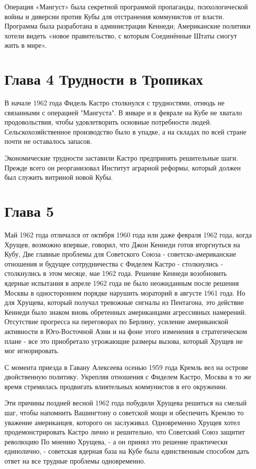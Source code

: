 \documentclass[14pt]{extreport}
\begin{document}
Операция «Мангуст» была секретной программой пропаганды, психологической войны и диверсии против Кубы для отстранения коммунистов от власти. Программа была разработана в администрации Кеннеди; Американские политики хотели видеть «новое правительство, с которым Соединённые Штаты смогут жить в мире».


\section{Глава 4 Трудности в Тропиках}

В начале 1962 года Фидель Кастро столкнулся с трудностями, отнюдь не связанными с операцией "Мангуста". В январе и в феврале на Кубе не хватало продовольствия, чтобы удовлетворить основные потребности людей. Сельскохозяйственное производство было в упадке, а на складах по всей стране почти не оставалось запасов.

Экономические трудности заставили Кастро предпринять решительные шаги. Прежде всего он реорганизовал Институт аграрной реформы, который должен был служить витриной новой Кубы.	

\section{Глава 5}

Май 1962 года отличался от октября 1960 года или даже февраля 1962 года, когда Хрущев, возможно впервые, говорил, что Джон Кеннеди готов вторгнуться на Кубу, Две главные проблемы для Советского Союза - советско-американские отношения и будущее сотрудничества с Фиделем Кастро - столкнулись - столкнулись в этом месяце, мае 1962 года. Решение Кеннеди возобновить ядерные испытания в апреле 1962 года не было неожиданным после решения Москвы в одностороннем порядке нарушить мораторий в августе 1961 года. Но для Хрущева, который получал тревожные сигналы из Пентагона, это действие Кеннеди было знаком вновь обретенных американцами агрессивных намерений. Отсутствие прогресса на переговорах по Берлину, усиление американской активности в Юго-Восточной Азии и на фоне этого изменения в стратегическом плане - все это приобретало угрожающие размеры вызова, который Хрущев не мог игнорировать.

С момента приезда в Гавану Алексеева осенью 1959 года Кремль вел на острове двойственную политику. Укрепляя отношения с Фиделем Кастро, Москва в то же время стремилась продвигать влиятельных коммунистов в его окружении.

Эти причины поздней весной 1962 года побудили Хрущева решиться на смелый шаг, чтобы напомнить Вашингтону о советской мощи и обеспечить Кремлю то уважение американцев, которого он заслуживал. Одновременно Хрущев хотел продемонстрировать Кастро лично и решительно, что Советский Союз защитит революцию По мнению Хрущева, - а он принял это решение практически единолично, - советская ядерная база на Кубе была единственным способом дать ответ на все трудные проблемы одновременно.
\end{document}
